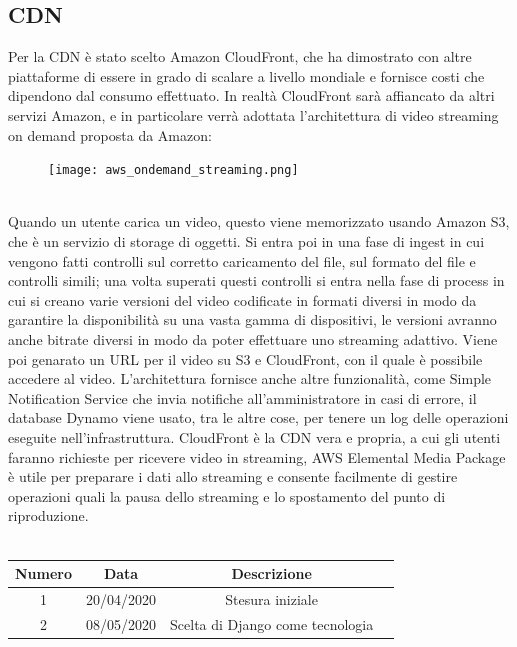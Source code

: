 \subsection{CDN}
Per la CDN è stato scelto Amazon CloudFront, che ha dimostrato con altre piattaforme di essere in grado di scalare a livello mondiale e fornisce costi che dipendono dal consumo effettuato. In realtà CloudFront sarà affiancato da altri servizi Amazon, e in particolare verrà adottata l'architettura di video streaming on demand proposta da Amazon:\\
\begin{figure}[!h]
\centering
\texttt{[image: aws\_ondemand\_streaming.png]}
\end{figure}\\
Quando un utente carica un video, questo viene memorizzato usando Amazon S3, che è un servizio di storage di oggetti. Si entra poi in una fase di ingest in cui vengono fatti controlli sul corretto caricamento del file, sul formato del file e controlli simili; una volta superati questi controlli si entra nella fase di process in cui si creano varie versioni del video codificate in formati diversi in modo da garantire la disponibilità su una vasta gamma di dispositivi, le versioni avranno anche bitrate diversi in modo da poter effettuare uno streaming adattivo. Viene poi genarato un URL per il video su S3 e CloudFront, con il quale è possibile accedere al video. L'architettura fornisce anche altre funzionalità, come Simple Notification Service che invia notifiche all'amministratore in casi di errore, il database Dynamo viene usato, tra le altre cose, per tenere un log delle operazioni eseguite nell'infrastruttura. CloudFront è la CDN vera e propria, a cui gli utenti faranno richieste per ricevere video in streaming, AWS Elemental Media Package è utile per preparare i dati allo streaming e consente facilmente di gestire operazioni quali la pausa dello streaming e lo spostamento del punto di riproduzione.
\newline\newline
{} \\ \\
\begin{tabular}{|c | c | c | c|} 
 	\hline
	 Numero & Data & Descrizione \\ [0.5ex] 
	\hline\hline
	1 & 20/04/2020 & Stesura iniziale \\ 
	\hline
	2 & 08/05/2020 & Scelta di Django come tecnologia \\
	\hline
\end{tabular}